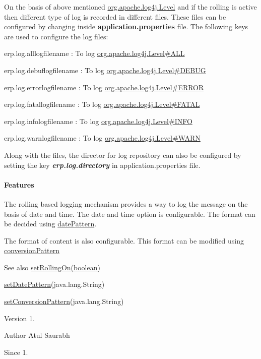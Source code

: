 On the basis of above mentioned \mbox{\hyperlink{}{org.\+apache.\+log4j.\+Level}} and if the rolling is active then different type of log is recorded in different files. These files can be configured by changing inside {\bfseries application.\+properties} file. The following keys are used to configure the log files\+: 
\begin{DoxyItemize}
\item erp.\+log.\+alllogfilename \+: To log \mbox{\hyperlink{}{org.\+apache.\+log4j.\+Level\#\+A\+LL}} 
\item erp.\+log.\+debuflogfilename \+: To log \mbox{\hyperlink{}{org.\+apache.\+log4j.\+Level\#\+D\+E\+B\+UG}} 
\item erp.\+log.\+errorlogfilename \+: To log \mbox{\hyperlink{}{org.\+apache.\+log4j.\+Level\#\+E\+R\+R\+OR}} 
\item erp.\+log.\+fatallogfilename \+: To log \mbox{\hyperlink{}{org.\+apache.\+log4j.\+Level\#\+F\+A\+T\+AL}} 
\item erp.\+log.\+infologfilename \+: To log \mbox{\hyperlink{}{org.\+apache.\+log4j.\+Level\#\+I\+N\+FO}} 
\item erp.\+log.\+warnlogfilename \+: To log \mbox{\hyperlink{}{org.\+apache.\+log4j.\+Level\#\+W\+A\+RN}} 
\end{DoxyItemize}Along with the files, the director for log repository can also be configured by setting the key {\bfseries {\itshape erp.\+log.\+directory}} in application.\+properties file. \paragraph*{Features}

The rolling based logging mechanism provides a way to log the message on the basis of date and time. The date and time option is configurable. The format can be decided using \mbox{\hyperlink{}{date\+Pattern}}. 

The format of content is also configurable. This format can be modified using \mbox{\hyperlink{}{conversion\+Pattern}}

\begin{DoxySeeAlso}{See also}
\mbox{\hyperlink{interfacecom_1_1dlinkddns_1_1atulsaurabh_1_1erpecosystem_1_1logger_1_1_logger_af32bfcb68d536836f7bdb8618e4c1812}{set\+Rolling\+On(boolean)}} 

\mbox{\hyperlink{interfacecom_1_1dlinkddns_1_1atulsaurabh_1_1erpecosystem_1_1logger_1_1_logger_aceef18a85b09966b1ccf10c9927d0917}{set\+Date\+Pattern}}(java.\+lang.\+String) 

\mbox{\hyperlink{classcom_1_1dlinkddns_1_1atulsaurabh_1_1erpecosystem_1_1logger_1_1_erp_ecosystem_logger_a16d43ce13e22b9fae1b9e3b55a086b06}{set\+Conversion\+Pattern}}(java.\+lang.\+String)
\end{DoxySeeAlso}
\begin{DoxyVersion}{Version}
1. 
\end{DoxyVersion}
\begin{DoxyAuthor}{Author}
Atul Saurabh 
\end{DoxyAuthor}
\begin{DoxySince}{Since}
1. 
\end{DoxySince}


